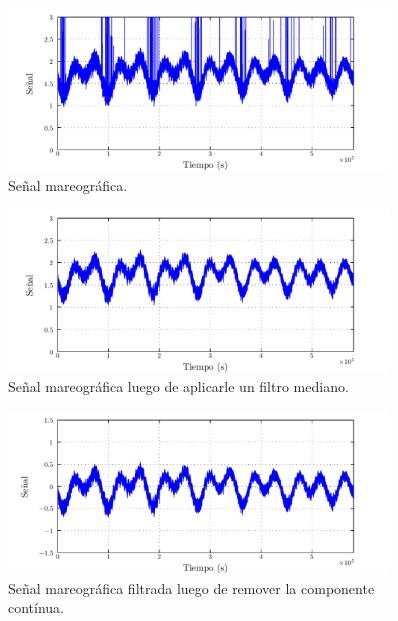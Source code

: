 \documentclass[a4paper,12pt,final]{article}
\begin{document}
      \newpage
      \begin{figure}[H]
        \begin{center}
          \caption{Señal mareográfica.}
          \label{p3f1}
          \vspace{-1em}
          \includegraphics[width=0.9\textwidth]{./laboratorio_5/problema03_signal.pdf}
        \end{center}
      \end{figure}
      \vspace{-0.25em}

      \begin{figure}[H]
        \begin{center}
          \caption{Señal mareográfica luego de aplicarle un filtro mediano.}
          \label{p3f2}
          \vspace{-1em}
          \includegraphics[width=0.9\textwidth]{./laboratorio_5/problema03_signal_median_filter.pdf}
        \end{center}
      \end{figure}
      \vspace{-0.25em}

      \begin{figure}[H]
        \begin{center}
          \caption{Señal mareográfica filtrada luego de remover la componente contínua.}
          \label{p3f3}
          \vspace{-1em}
          \includegraphics[width=0.9\textwidth]{./laboratorio_5/problema03_signal_removed_mean.pdf}
        \end{center}
      \end{figure}
      \vfill
\end{document}
